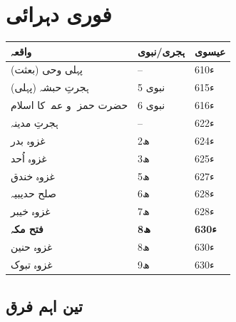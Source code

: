 
\section*{فوری دہرائی}

\begin{nukta}
\begin{center}
\begin{tabular}{@{}p{6.0cm} p{2.6cm} p{4.6cm}@{}}
\toprule
\textbf{واقعہ} & \textbf{ہجری/نبوی} & \textbf{عیسوی} \\
\midrule
پہلی وحی (بعثت)          & \textenglish{--}       & \textenglish{610}ء \\
ہجرتِ حبشہ (پہلی)         & \textenglish{5} نبوی    & \textenglish{615}ء \\
حضرت حمزہؓ و عمرؓ کا اسلام & \textenglish{6} نبوی    & \textenglish{616}ء \\
ہجرتِ مدینہ               & \textenglish{--}       & \textenglish{622}ء \\
غزوہ بدر                  & \textenglish{2}ھ       & \textenglish{624}ء \\
غزوہ اُحد                 & \textenglish{3}ھ       & \textenglish{625}ء \\
غزوہ خندق                 & \textenglish{5}ھ       & \textenglish{627}ء \\
صلح حدیبیہ                & \textenglish{6}ھ       & \textenglish{628}ء \\
غزوہ خیبر                 & \textenglish{7}ھ       & \textenglish{628}ء \\
\textbf{فتح مکہ}          & \textbf{\textenglish{8}ھ} & \textbf{\textenglish{630}ء} \\
غزوہ حنین                 & \textenglish{8}ھ       & \textenglish{630}ء \\
غزوہ تبوک                 & \textenglish{9}ھ       & \textenglish{630}ء \\
\bottomrule
\end{tabular}
\end{center}
\end{nukta}

\medskip
\subsection*{تین اہم فرق}

